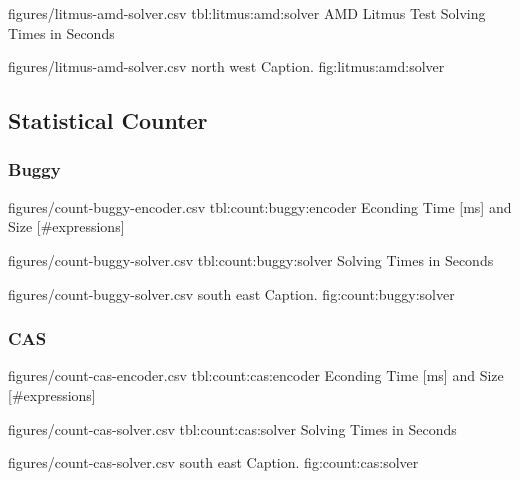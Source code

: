 
\SolverStatsTable
  {figures/litmus-amd-solver.csv}
  {tbl:litmus:amd:solver}
  {AMD Litmus Test Solving Times in Seconds}

\SolverStatsGraph
  {figures/litmus-amd-solver.csv}
  {north west}
  {Caption.}
  {fig:litmus:amd:solver}

\newpage

\subsection*{Statistical Counter}

\subsubsection*{Buggy}

\renewcommand{\StatsTableRowHeader}[1]{#1}


\EncoderStatsTable
  {figures/count-buggy-encoder.csv}
  {tbl:count:buggy:encoder}
  {Econding Time [ms] and Size [\#expressions]}


\SolverStatsTable
  {figures/count-buggy-solver.csv}
  {tbl:count:buggy:solver}
  {Solving Times in Seconds}


\SolverStatsGraph
  {figures/count-buggy-solver.csv}
  {south east}
  {Caption.}
  {fig:count:buggy:solver}

\newpage

\subsubsection*{CAS}


\EncoderStatsTable
  {figures/count-cas-encoder.csv}
  {tbl:count:cas:encoder}
  {Econding Time [ms] and Size [\#expressions]}


\SolverStatsTable
  {figures/count-cas-solver.csv}
  {tbl:count:cas:solver}
  {Solving Times in Seconds}

\SolverStatsGraph
  {figures/count-cas-solver.csv}
  {south east}
  {Caption.}
  {fig:count:cas:solver}
